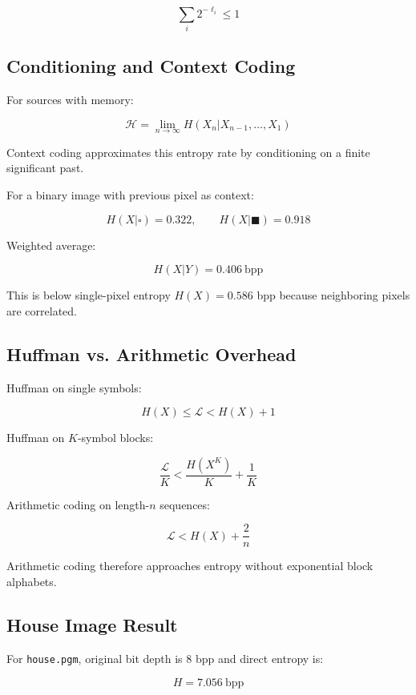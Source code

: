 \[
\sum_i2^{-\ell_i}\leq1
\]

\subsection{Conditioning and Context Coding}

For sources with memory:

\[
\mathcal{H}=\lim_{n\to\infty}H(X_n|X_{n-1},\ldots,X_1)
\]

Context coding approximates this entropy rate by conditioning on a finite significant past.

For a binary image with previous pixel as context:

\[
H(X|\square)=0.322,\qquad H(X|\blacksquare)=0.918
\]

Weighted average:

\[
H(X|Y)=0.406\ \text{bpp}
\]

This is below single-pixel entropy $H(X)=0.586$ bpp because neighboring pixels are correlated.

\subsection{Huffman vs. Arithmetic Overhead}

Huffman on single symbols:

\[
H(X)\leq\mathcal{L}<H(X)+1
\]

Huffman on $K$-symbol blocks:

\[
\frac{\mathcal{L}}{K}<\frac{H(X^K)}{K}+\frac{1}{K}
\]

Arithmetic coding on length-$n$ sequences:

\[
\mathcal{L}<H(X)+\frac{2}{n}
\]

Arithmetic coding therefore approaches entropy without exponential block alphabets.

\subsection{House Image Result}

For \texttt{house.pgm}, original bit depth is 8 bpp and direct entropy is:

\[
H=7.056\ \text{bpp}
\]

\begin{center}
\end{center}

